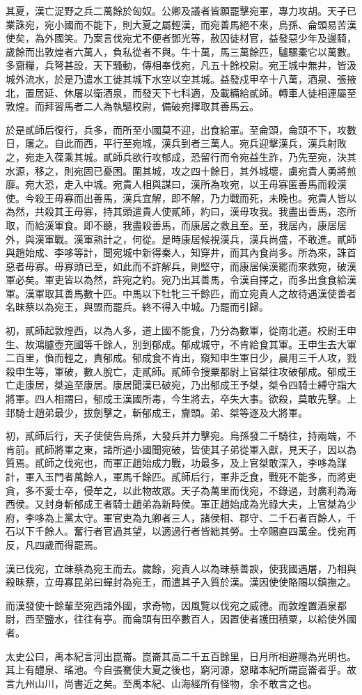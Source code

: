 其夏，漢亡浞野之兵二萬餘於匈奴。公卿及議者皆願罷擊宛軍，專力攻胡。天子已業誅宛，宛小國而不能下，則大夏之屬輕漢，而宛善馬絕不來，烏孫、侖頭易苦漢使矣，為外國笑。乃案言伐宛尤不便者鄧光等，赦囚徒材官，益發惡少年及邊騎，歲餘而出敦煌者六萬人，負私從者不與。牛十萬，馬三萬餘匹，驢騾橐它以萬數。多齎糧，兵弩甚設，天下騷動，傳相奉伐宛，凡五十餘校尉。宛王城中無井，皆汲城外流水，於是乃遣水工徙其城下水空以空其城。益發戍甲卒十八萬，酒泉、張掖北，置居延、休屠以衛酒泉，而發天下七科適，及載糒給貳師。轉車人徒相連屬至敦煌。而拜習馬者二人為執驅校尉，備破宛擇取其善馬云。

於是貳師后復行，兵多，而所至小國莫不迎，出食給軍。至侖頭，侖頭不下，攻數日，屠之。自此而西，平行至宛城，漢兵到者三萬人。宛兵迎擊漢兵，漢兵射敗之，宛走入葆乘其城。貳師兵欲行攻郁成，恐留行而令宛益生詐，乃先至宛，決其水源，移之，則宛固已憂困。圍其城，攻之四十餘日，其外城壞，虜宛貴人勇將煎靡。宛大恐，走入中城。宛貴人相與謀曰，漢所為攻宛，以王毋寡匿善馬而殺漢使。今殺王毋寡而出善馬，漢兵宜解，即不解，乃力戰而死，未晚也。宛貴人皆以為然，共殺其王毋寡，持其頭遣貴人使貳師，約曰，漢毋攻我。我盡出善馬，恣所取，而給漢軍食。即不聽，我盡殺善馬，而康居之救且至。至，我居內，康居居外，與漢軍戰。漢軍熟計之，何從。是時康居候視漢兵，漢兵尚盛，不敢進。貳師與趙始成、李哆等計，聞宛城中新得秦人，知穿井，而其內食尚多。所為來，誅首惡者毋寡。毋寡頭已至，如此而不許解兵，則堅守，而康居候漢罷而來救宛，破漢軍必矣。軍吏皆以為然，許宛之約。宛乃出其善馬，令漢自擇之，而多出食食給漢軍。漢軍取其善馬數十匹。中馬以下牡牝三千餘匹，而立宛貴人之故待遇漢使善者名昧蔡以為宛王，與盟而罷兵。終不得入中城。乃罷而引歸。

初，貳師起敦煌西，以為人多，道上國不能食，乃分為數軍，從南北道。校尉王申生、故鴻臚壺充國等千餘人，別到郁成。郁成城守，不肯給食其軍。王申生去大軍二百里，偩而輕之，責郁成。郁成食不肯出，窺知申生軍日少，晨用三千人攻，戮殺申生等，軍破，數人脫亡，走貳師。貳師令搜粟都尉上官桀往攻破郁成。郁成王亡走康居，桀追至康居。康居聞漢已破宛，乃出郁成王予桀，桀令四騎士縛守詣大將軍。四人相謂曰，郁成王漢國所毒，今生將去，卒失大事。欲殺，莫敢先擊。上邽騎士趙弟最少，拔劍擊之，斬郁成王，齎頭。弟、桀等逐及大將軍。

初，貳師后行，天子使使告烏孫，大發兵并力擊宛。烏孫發二千騎往，持兩端，不肯前。貳師將軍之東，諸所過小國聞宛破，皆使其子弟從軍入獻，見天子，因以為質焉。貳師之伐宛也，而軍正趙始成力戰，功最多，及上官桀敢深入，李哆為謀計，軍入玉門者萬餘人，軍馬千餘匹。貳師后行，軍非乏食，戰死不能多，而將吏貪，多不愛士卒，侵牟之，以此物故眾。天子為萬里而伐宛，不錄過，封廣利為海西侯。又封身斬郁成王者騎士趙弟為新畤侯。軍正趙始成為光祿大夫，上官桀為少府，李哆為上黨太守。軍官吏為九卿者三人，諸侯相、郡守、二千石者百餘人，千石以下千餘人。奮行者官過其望，以適過行者皆絀其勞。士卒賜直四萬金。伐宛再反，凡四歲而得罷焉。

漢已伐宛，立昧蔡為宛王而去。歲餘，宛貴人以為昧蔡善諛，使我國遇屠，乃相與殺昧蔡，立毋寡昆弟曰蟬封為宛王，而遣其子入質於漢。漢因使使賂賜以鎮撫之。

而漢發使十餘輩至宛西諸外國，求奇物，因風覽以伐宛之威德。而敦煌置酒泉都尉，西至鹽水，往往有亭。而侖頭有田卒數百人，因置使者護田積粟，以給使外國者。

太史公曰，禹本紀言河出崑崙。崑崙其高二千五百餘里，日月所相避隱為光明也。其上有醴泉、瑤池。今自張騫使大夏之後也，窮河源，惡睹本紀所謂崑崙者乎。故言九州山川，尚書近之矣。至禹本紀、山海經所有怪物，余不敢言之也。